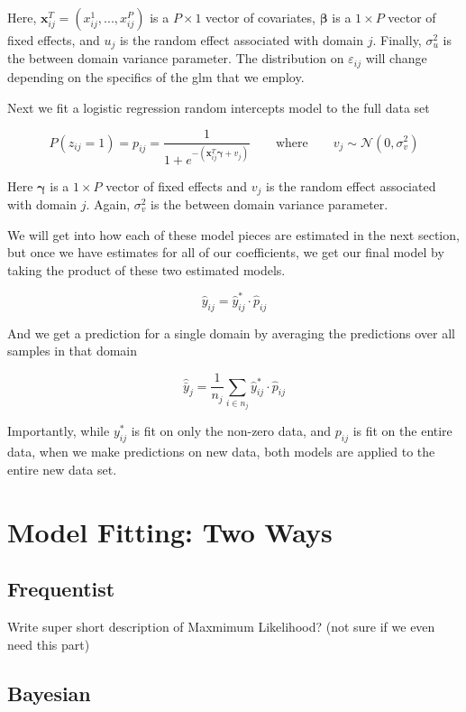 \documentclass[12pt,twoside]{reedthesis}
\begin{document}
Here, \(\mathbf{x}_{ij}^T = (x^1_{ij}, ..., x^P_{ij})\) is a \(P\times 1\) vector of covariates, \(\boldsymbol{\beta}\) is a \(1\times P\) vector of fixed effects, and \(u_j\) is the random effect associated with domain \(j\). Finally, \(\sigma^2_{u}\) is the between domain variance parameter. The distribution on \(\varepsilon_{ij}\) will change depending on the specifics of the glm that we employ.

Next we fit a logistic regression random intercepts model to the full data set

\[
P(z_{ij} = 1) = p_{ij} = \frac{1}{1 + e^{-(\mathbf{x}_{ij}^T\boldsymbol{\gamma} + v_j)}} \qquad \text{where} \qquad v_j \sim \mathcal{N}(0, \sigma_v^2)
\]

Here \(\boldsymbol{\gamma}\) is a \(1\times P\) vector of fixed effects and \(v_j\) is the random effect associated with domain \(j\). Again, \(\sigma^2_v\) is the between domain variance parameter.

We will get into how each of these model pieces are estimated in the next section, but once we have estimates for all of our coefficients, we get our final model by taking the product of these two estimated models.

\[
\hat{y}_{ij} = \hat{y}^*_{ij}\cdot \hat{p}_{ij}
\]

And we get a prediction for a single domain by averaging the predictions over all samples in that domain

\[
\hat{\bar{y}}_j = \frac{1}{n_j}\sum_{i \in n_j}\hat{y}^*_{ij}\cdot \hat{p}_{ij}
\]

Importantly, while \(y^*_{ij}\) is fit on only the non-zero data, and \(p_{ij}\) is fit on the entire data, when we make predictions on new data, both models are applied to the entire new data set.

\hypertarget{model-fitting-two-ways}{%
\section{Model Fitting: Two Ways}\label{model-fitting-two-ways}}

\hypertarget{frequentist}{%
\subsection{Frequentist}\label{frequentist}}

Write super short description of Maxmimum Likelihood? (not sure if we even need this part)

\hypertarget{bayesian}{%
\subsection{Bayesian}\label{bayesian}}
\end{document}
